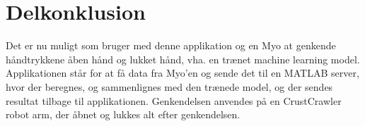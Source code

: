 \section{Delkonklusion}
Det er nu muligt som bruger med denne applikation og en Myo at genkende håndtrykkene åben hånd og lukket hånd, vha. en trænet machine learning model. Applikationen står for at få data fra Myo'en og sende det til en MATLAB server, hvor der beregnes, og sammenlignes med den trænede model, og der sendes resultat tilbage til applikationen. Genkendelsen anvendes på en CrustCrawler robot arm, der åbnet og lukkes alt efter genkendelsen.